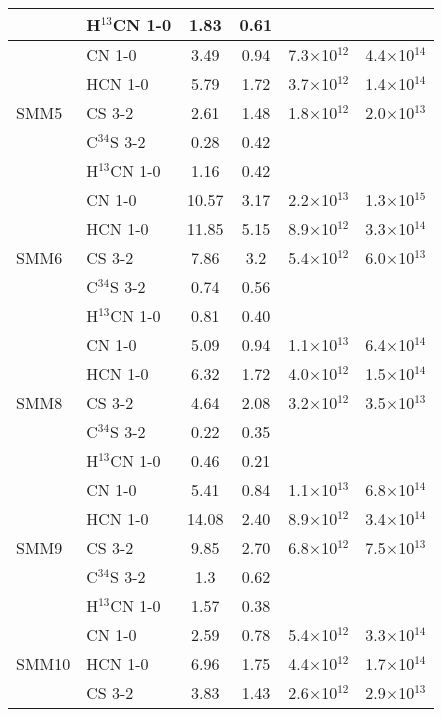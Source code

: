\documentclass{aa}
\begin{document}
\begin{table*}
\begin{tabular}{l l c c c c}
{} & H$^{13}$CN 1-0 & 1.83 & 0.61 & &\\ 
\hline
\multirow{5}{*}{SMM5} & CN 1-0 & 3.49 & 0.94 & 7.3$\times$10$^{12}$ & 4.4$\times$10$^{14}$\\
{} & HCN 1-0 & 5.79 & 1.72 & 3.7$\times$10$^{12}$ & 1.4$\times$10$^{14}$\\ 
{} & CS 3-2 & 2.61 & 1.48 & 1.8$\times$10$^{12}$ & 2.0$\times$10$^{13}$\\  
{} & C$^{34}$S 3-2 & 0.28 & 0.42  &  & \\ 
{} & H$^{13}$CN 1-0 & 1.16 & 0.42  & & \\ 
\hline
\multirow{5}{*}{SMM6} & CN 1-0 & 10.57 & 3.17 & 2.2$\times$10$^{13}$ & 1.3$\times$10$^{15}$\\
{} & HCN 1-0 & 11.85 & 5.15 & 8.9$\times$10$^{12}$ & 3.3$\times$10$^{14}$\\ 
{} & CS 3-2 & 7.86 & 3.2 & 5.4$\times$10$^{12}$ & 6.0$\times$10$^{13}$\\  
{} & C$^{34}$S 3-2 & 0.74 & 0.56 & & \\ 
{} & H$^{13}$CN 1-0 & 0.81 & 0.40 & & \\
\hline
\multirow{5}{*}{SMM8} & CN 1-0 & 5.09 & 0.94 & 1.1$\times$10$^{13}$ & 6.4$\times$10$^{14}$\\
{} & HCN 1-0 & 6.32 & 1.72 & 4.0$\times$10$^{12}$ & 1.5$\times$10$^{14}$ \\ 
{} & CS 3-2 & 4.64 & 2.08 & 3.2$\times$10$^{12}$ & 3.5$\times$10$^{13}$ \\  
{} & C$^{34}$S 3-2 & 0.22 & 0.35 &  &  \\ 
{} & H$^{13}$CN 1-0 & 0.46 & 0.21 &  & \\
\hline
\multirow{5}{*}{SMM9} & CN 1-0 & 5.41 & 0.84 & 1.1$\times$10$^{13}$ & 6.8$\times$10$^{14}$\\
{} & HCN 1-0 & 14.08 & 2.40 & 8.9$\times$10$^{12}$ & 3.4$\times$10$^{14}$ \\ 
{} & CS 3-2 & 9.85 & 2.70 & 6.8$\times$10$^{12}$ & 7.5$\times$10$^{13}$\\ 
{} & C$^{34}$S 3-2 & 1.3 & 0.62 &  & \\ 
{} & H$^{13}$CN 1-0 & 1.57 & 0.38 & & \\ 
\hline
\multirow{5}{*}{SMM10} & CN 1-0 & 2.59 & 0.78 & 5.4$\times$10$^{12}$ & 3.3$\times$10$^{14}$\\
{} & HCN 1-0 & 6.96 & 1.75 & 4.4$\times$10$^{12}$ & 1.7$\times$10$^{14}$\\ 
{} & CS 3-2 & 3.83 & 1.43 & 2.6$\times$10$^{12}$ & 2.9$\times$10$^{13}$ \\  

\end{tabular}
\end{table*}
\end{document}
